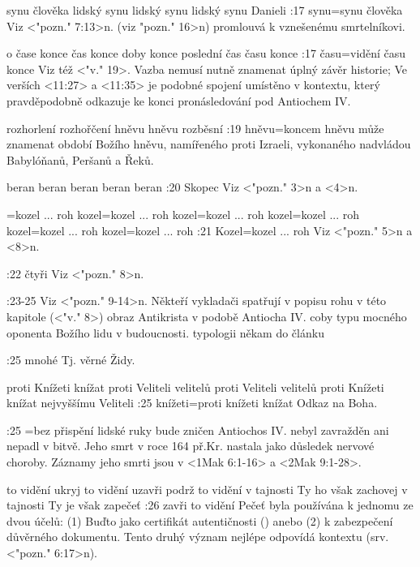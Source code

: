     {synu člověka} %
    {lidský synu}  %
    {lidský synu} %
    {lidský synu}  %
    {Danieli}  %
:17 {synu}={synu člověka} Viz <"pozn." 7:13>n.  (viz \<"pozn." 16>n) promlouvá k vznešenému smrtelníkovi.

   {o čase konce}   %
   {čas konce}   %
   {doby konce}   %
   {poslední čas}   %
   {času konce}   %
:17 {času}={vidění času konce} Viz též <"v." 19>. Vazba nemusí nutně znamenat úplný závěr historie; Ve verších <11:27> a <11:35> je podobné spojení umístěno v kontextu, který pravděpodobně odkazuje ke konci pronásledování pod Antiochem IV.

   {rozhorlení}   %
   {rozhořčení}   %
   {hněvu}   %
   {hněvu}   %
   {rozběsní}   %
:19 {hněvu}={koncem hněvu}  může znamenat období Božího hněvu, namířeného proti   Izraeli, vykonaného nadvládou Babylóňanů, Peršanů a Řeků. 

   {beran}   %
   {beran}   %
   {beran}   %
   {beran}   %
   {beran}   %
:20 {Skopec} Viz <"pozn." 3>n a <4>n.

={kozel ... roh}   %
   {kozel}={kozel ... roh}   %
   {kozel}={kozel ... roh}   %
   {kozel}={kozel ... roh}   %
   {kozel}={kozel ... roh}   %
   {kozel}={kozel ... roh}   %
:21 {Kozel}={kozel ... roh} Viz <"pozn." 5>n a <8>n.

:22 {čtyři} Viz  <"pozn." 8>n.

:23-25 {} Viz  <"pozn." 9-14>n. Někteří vykladači spatřují v popisu rohu v této kapitole (<"v." 8>)
obraz Antikrista v podobě Antiocha IV. coby typu mocného oponenta Božího lidu v budoucnosti.  
\dopsat typologii někam do článku

:25 {mnohé} Tj. věrné Židy.

   {proti Knížeti knížat}   %
   {proti Veliteli velitelů}   %
   {proti Veliteli velitelů}   %
   {proti Knížeti knížat}   %
   {nejvyššímu Veliteli}   %
:25 {knížeti}={proti knížeti knížat} Odkaz na Boha.

:25 {}={bez přispění lidské ruky bude zničen} Antiochos IV. nebyl zavražděn ani nepadl v bitvě. Jeho smrt v roce 164 př.Kr. nastala jako důsledek nervové choroby. Záznamy jeho smrti jsou v <1Mak 6:1-16> a <2Mak 9:1-28>.

    {to vidění ukryj}  %
    {to vidění uzavři}  %
    {podrž to vidění v tajnosti}  %
    {Ty ho však zachovej v tajnosti}  %
    {Ty je však zapečeť}  %
:26 {zavři to vidění} Pečeť byla používána k jednomu ze dvou účelů: (1) Buďto jako certifikát autentičnosti () anebo (2) k zabezpečení  důvěrného dokumentu. Tento druhý význam nejlépe odpovídá kontextu (srv. <"pozn." 6:17>n).



